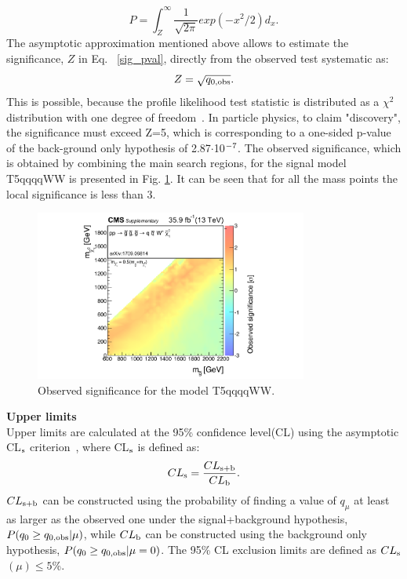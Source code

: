 \begin{equation}
\label{sig_pval}
  P = \int_{Z}^{\infty} \frac{1}{\sqrt{2\pi}}exp(-x^2/2) d_x.
\end{equation}
The asymptotic approximation mentioned above allows to estimate the significance, $Z$ in Eq.~ \ref{sig_pval}, directly from the observed test systematic as:
\begin{equation}
  {Z} = {\sqrt{q_{0,\rm obs}}}.
\end{equation}
This is possible, because the profile likelihood test statistic is distributed as a $\chi^2$ distribution with one degree of freedom~\cite{halfChiSq}. In particle physics, to claim "discovery", the significance must exceed Z=5, which is corresponding to a one-sided p-value of the back-ground only hypothesis of 2.87$\cdot$10$^{\rm -7}$. The observed significance, which is obtained by combining the main search regions,  for the signal model T5qqqqWW is presented in Fig. \ref{fig:obsig}. It can be seen that for all the mass points the local significance is less than 3.\\
\begin{figure}[!h]
\begin{center}
\includegraphics[width=0.8\textwidth]{Plots/analysis/results/CMS-SUS-16-042_Figure-aux_002.pdf}
\caption{Observed significance for the model T5qqqqWW.}\label{fig:obsig}
\end{center}
\end{figure}
\textbf{Upper limits}\\
Upper limits are calculated at the 95\% confidence level(CL) using the asymptotic CL$_{\rm s}$ criterion~\cite{CLs1}, where CL$_{\rm s}$ is defined as:
 \begin{equation}
\label{uplim}
  CL_{\rm s}=\frac{CL_{\rm s+b}}{CL_{\rm b}}.
\end{equation}
$CL_{\rm s+b}$ can be constructed using the probability of finding a value of $q_\mu$ at least as larger as the observed one under the signal+background hypothesis, $P(q_0\geq q_{0,\rm obs}|\mu)$, while $CL_{\rm b}$ can be constructed using the background only hypothesis, $P(q_0\geq q_{0,\rm obs}|\mu=0)$.
The 95\% CL exclusion limits are defined as $CL_{\rm s}$$(\mu)\leq5$\%.\\

